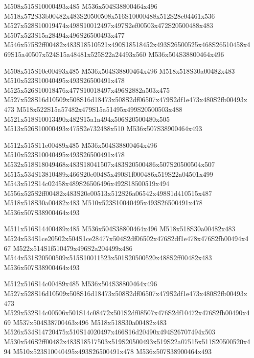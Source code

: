 \documentclass{article}
\begin{document}
\begin{multicols}{5}
\begin{center}

M508x515S10000493x485 %
M536x504S38800464x496 %
M518x572S33b00482x483S20500508x516S10000488x512S28e04461x536 %
M527x528S10019474x498S10012497x497S2ef00503x472S20500488x483 %
M507x523S15a28494x496S26500493x477 %
M546x575S2ff00482x483S18510521x490S18518452x493S26500525x468S26510458x469S15a40507x524S15a48481x525S22a24493x560 %
M536x504S38800464x496 %
\vfil
\columnbreak

M508x515S10e00493x485 %
M536x504S38800464x496 %
M518x518S30a00482x483 %
M510x523S10040495x493S26500491x478 %
M525x526S10018476x477S10018497x496S2882a503x475 %
M527x528S16d10509x508S16d18473x508S2df06507x479S2df1e473x480S2fb00493x473 %
M518x522S15a57482x479S15a51495x499S20500503x488 %
M521x518S10013490x482S15a1a494x506S20500480x505 %
M513x526S10000493x475S2e732488x510 %
M536x507S38900464x493 %
\vfil
\columnbreak

M512x515S11e00489x485 %
M536x504S38800464x496 %
M510x523S10040495x493S26500491x478 %
M532x518S18049468x483S18041507x483S20500486x507S20500504x507 %
M515x534S13810489x466S20e00485x490S1f000486x519S22a04501x499 %
M543x512S14c02458x489S26506496x492S18500519x494 %
M556x525S2ff00482x483S20e00513x512S26a06542x498S1d410515x487 %
M518x518S30a00482x483 %
M510x523S10040495x493S26500491x478 %
M536x507S38900464x493 %
\vfil
\columnbreak

M511x516S14400489x485 %
M536x504S38800464x496 %
M518x518S30a00482x483 %
M524x534S1ce20502x504S1ce28477x504S2df06502x476S2df1e478x476S2fb00494x467 %
M522x514S1f510479x496S2a204499x486 %
M544x531S20500509x515S10011523x501S20500520x488S2ff00482x483 %
M536x507S38900464x493 %
\vfil
\columnbreak

M512x516S14c00489x485 %
M536x504S38800464x496 %
M527x528S16d10509x508S16d18473x508S2df06507x479S2df1e473x480S2fb00493x473 %
M529x532S14c00506x501S14c08472x501S2df08507x476S2df10472x476S2fb00490x469 %
M537x504S38700463x496 %
M518x518S30a00482x483 %
M526x534S14720475x510S14020497x466S16d20490x494S26707494x503 %
M530x546S2ff00482x483S18517503x519S20500493x519S22a07515x511S20500520x494 %
M510x523S10040495x493S26500491x478 %
M536x507S38900464x493 %
\vfil

\end{center}
\end{multicols}
\end{document}
